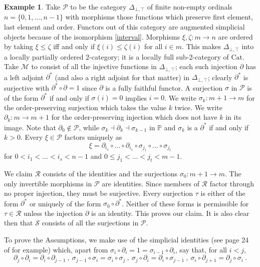 \documentclass[a4paper,12pt,reqno]{amsart}
\theoremstyle{definition}
\newtheorem{example}[theorem]{Example}
\theoremstyle{fact}
\theoremstyle{genquest}
\theoremstyle{step}
\newcommand{\ra}{\rightarrow}
\def\CM{{\mathscr M}}
\def\CP{{\mathscr P}}
\def\CR{{\mathscr R}}
\def\CS{{\mathscr S}}
\begin{document}
\begin{example}\label{Ex2+}
Take $\CP$ to be the category $\Delta_{\bot,\top}$ of finite
non-empty ordinals $n = \{0,1,\dots,n-1\}$ with morphisms those functions which preserve
first element, last element and order.
Functors out of this category are augmented simplicial objects because of the isomorphism \eqref{interval}. 
Morphisms $\xi, \zeta : m\ra n$ are ordered by taking $\xi \le \zeta$ iff and only if 
$\xi(i) \le \zeta(i)$ for all $i\in m$. This makes $\Delta_{\bot,\top}$ into a locally
partially ordered 2-category;
it is a locally full sub-2-category of $\mathrm{Cat}$. 
Take $\CM$ to consist of all the injective functions in $\Delta_{\bot,\top}$;
each such injection $\partial$ has a left adjoint $\partial^*$ 
(and also a right adjoint for that matter) in $\Delta_{\bot,\top}$; clearly $\partial^*$ is
surjective with $\partial^* \circ \partial = 1$ since $\partial$ is a fully faithful functor.
A surjection $\sigma$ in $\CP$ is of the form $\partial^*$ if and only if $\sigma(i)=0$
implies $i=0$.    
We write $\sigma_k : m+1 \ra m$ for the order-preserving surjection which takes the value $k$ twice.
We write $\partial_k : m \ra m+1$ for the order-preserving injection which does not have $k$ in its image. 
Note that $\partial_0\notin \CP$, while $\sigma_k \dashv \partial_k  \dashv \sigma_{k-1}$ 
in $\mathbb{P}$ and $\sigma_k$ is a $\partial^*$ if and only if $k>0$.
Every $\xi \in \CP$ factors uniquely as 
$$\xi = \partial_{i_s}\circ \dots \circ \partial_{i_1}\circ \sigma_{j_1}\circ \dots \circ \sigma_{j_t}$$ 
for $0< i_1<\dots < i_s < n-1$ and $0\le j_1<\dots < j_t < m-1$. 

We claim $\CR$ consists of the identities and the surjections $\sigma_0 : m+1 \ra m$.
The only invertible morphisms in $\CP$ are identities.
Since members of $\CR$ factor through no proper injection, they must be surjective.
Every surjection $\tau$ is either of the form $\partial^*$ or uniquely of the form 
$\sigma_0\circ \partial^*$. 
Neither of these forms is permissible for $\tau \in \CR$ unless the injection $\partial$
is an identity. This proves our claim. 
It is also clear then that $\CS$ consists of all the surjections in $\CP$. 

To prove the Assumptions, we make use of the simplicial identities 
(see page 24 of \cite{GabZis} for example) which, 
apart from $\sigma_i\circ \partial_i = 1 = \sigma_{i-1}\circ \partial_i$,
say that, for all $i<j$, 
$$\partial_j\circ \partial_i = \partial_i \circ \partial_{j-1} \ , \ \sigma_{j-1}\circ \sigma_i = \sigma_i \circ \sigma_j \ , \ \sigma_{j}\circ \partial_i = \partial_i \circ \sigma_{j-1} \ , \ \sigma_{i}\circ \partial_{j+1} = \partial_j \circ \sigma_i \ .$$


\end{example}
\end{document}
